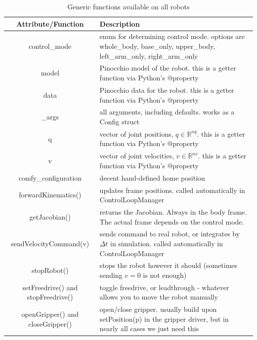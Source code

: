 \begin{table}[h!]
\centering
\label{table-abstract-robot}
\begin{tabular}{c | p{9cm}}
\textbf{Attribute/Function} & \textbf{Description}\\
\hline 
control\_mode & enum for determining control mode. 
options are whole\_body, base\_only, upper\_body, 
	   left\_arm\_only, right\_arm\_only \\
\hline 
model & Pinocchio model of the robot. this is a getter function via Python's @property  \\
\hline 
data & Pinocchio data for the robot. this is a getter function via Python's @property  \\
\hline 
\_args & all arguments, including defaults. works
as a Config struct\\
\hline 
q & vector of joint positions, $ q \in \mathbb{R}^{nq}  $. this is a getter function via Python's @property \\
\hline 
v & vector of joint velocities, $ v \in \mathbb{R}^{nv}  $. this is a getter function via Python's @property  \\
\hline 
comfy\_configuration & decent hand-defined home position \\
\hline 
forwardKinematics() & updates frame positions. called automatically in ControlLoopManager  \\
\hline 
getJacobian() & returns the Jacobian. Always in the body frame. The actual frame depends on the control mode.   \\
\hline 
sendVelocityCommand(v) & sends command to real robot, or integrates by 
$ \Delta t  $ in simulation. called automatically in ControlLoopManager  \\
\hline 
stopRobot() & stops the robot however it should (sometimes sending $ v =0  $ is not enough) \\
\hline 
setFreedrive() and stopFreedrive() & toggle freedrive, or leadthrough - whatever allows you to move
the robot manually \\
\hline 
openGripper() and closeGripper() & open/close gripper. usually build upon setPosition(p) 
in the gripper driver, but in nearly all cases we just need this\\
\end{tabular}
\caption{Generic functions available on all robots}
\end{table}


